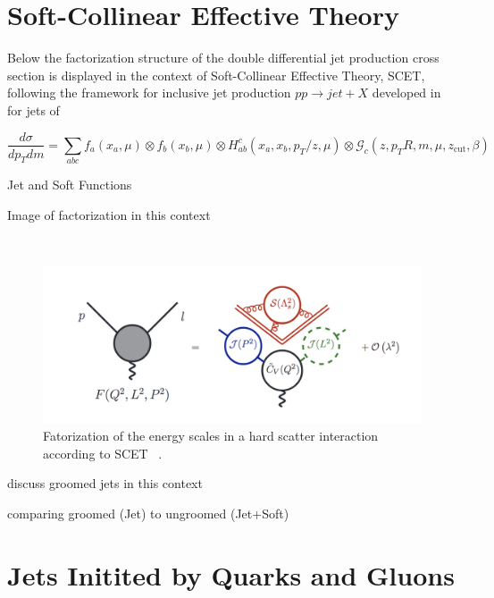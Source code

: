 

\section{Soft-Collinear Effective Theory}\label{sec:SCET}


Below the factorization structure of the double differential jet production cross section is displayed in the context of Soft-Collinear Effective Theory, SCET, following the framework for inclusive jet production $pp \rightarrow jet + X$ developed in for jets of  %

\begin{equation}
\frac{d \sigma}{ d p_{T} d m}=\sum_{a b c} f_{a}\left(x_{a}, \mu\right) \otimes f_{b}\left(x_{b}, \mu\right) \otimes H_{a b}^{c}\left(x_{a}, x_{b}, p_{T} / z, \mu\right) \otimes \mathcal{G}_{c}\left(z, p_{T} R, m, \mu, z_{\mathrm{cut}}, \beta\right)
\end{equation}

Jet and Soft Functions 


Image of factorization in this context

~\cite{Becher:2014oda}
\begin{figure}[htb]
\centering
\includegraphics[width=1.0\textwidth]{visuals/SCET-factorization.png}
\caption{Fatorization of the energy scales in a hard scatter interaction according to SCET ~\cite{Becher:2014oda}.}
\label{fig:scet}
\end{figure}
discuss groomed jets in this context

comparing groomed  (Jet) to ungroomed (Jet+Soft)



\section{Jets Initited by Quarks and Gluons }\label{sec:quarkandgluonjets}



